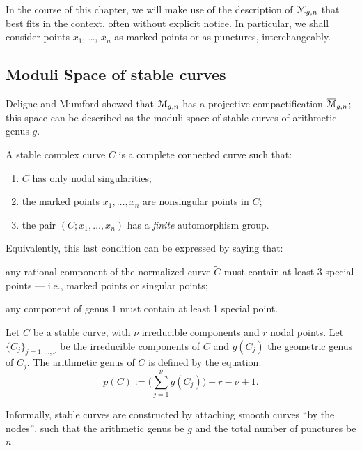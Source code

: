 In the course of this chapter, we will make use of the description of
$\mathcal{M}_{g,n}$ that best fits in the context, often without explicit
notice.  In particular, we shall consider points $x_1$, \ldots, $x_n$ as
marked points or as punctures, interchangeably.

\subsection{Moduli Space of stable curves}
\label{sec:moduli-space-stable}

Deligne and Mumford \cite{deligne-mumford} showed that $\mathcal{M}_{g,n}$ has
a projective compactification $\overline{\mathcal{M}}_{g,n}$; this space can be
described as the moduli space of stable curves of arithmetic genus
$g$.
\begin{definition}
  A stable complex curve $C$ is a complete connected curve such that:
  \begin{enumerate}
  \item $C$ has only nodal singularities;
  \item the marked points $x_1, \ldots, x_n$ are nonsingular points in
    $C$;
  \item the pair $(C; x_1, \ldots, x_n)$ has a \emph{finite} automorphism
    group.
  \end{enumerate}
\end{definition}
Equivalently, this last condition can be expressed by saying that:
\begin{inparaenum}[\slshape a)]
\item any rational component of the normalized curve $\tilde C$
  must contain at least 3 special points --- i.e., marked points or
  singular points;
\item  any component of genus $1$ must contain
  at least 1 special point.
\end{inparaenum}

Let $C$ be a stable curve, with $\nu$ irreducible components and $r$
nodal points. Let $\{C_j\}_{j=1, \dots, \nu}$ be the irreducible
components of $C$ and $g(C_j)$ the geometric genus of $C_j$.  The
arithmetic genus of $C$ is defined by the equation:
\begin{equation*}
  p(C) := \bigl({\textstyle \sum_{j=1}^\nu} g(C_j) \bigr) + r - \nu + 1.
\end{equation*}

Informally, stable curves are constructed by attaching smooth curves
``by the nodes'', such that the arithmetic genus be $g$ and the total
number of punctures be $n$.



